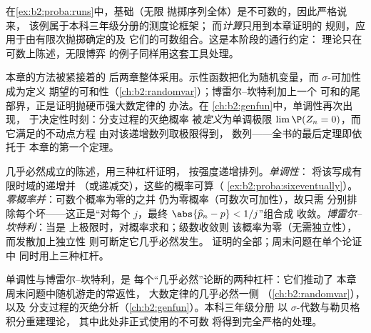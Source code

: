 \begin{remark}
在\cref{ex:b2:proba:runs}中，基础（无限
抛掷序列全体）是不可数的，因此严格说来，
该例属于本科三年级分册的测度论框架；
而\emph{计算}只用到本章证明的
规则，应用于由有限次抛掷确定的及
它们的可数组合。这是本阶段的通行约定：
理论只在可数上陈述，无限博弈
的例子同样用这套工具处理。
\end{remark}

\begin{remark}[本分册内的展望]
本章的方法被紧接着的
后两章整体采用。示性函数把化为随机变量，而
$\sigma$-可加性成为定义
期望的可和性（\cref{ch:b2:randomvar}）；博雷尔--坎特利加上一个
可和的尾部界，正是证明抛硬币强大数定律的
办法。在
\cref{ch:b2:genfun}中，单调性再次出现，
于决定性时刻：分支过程的灭绝概率
被\emph{定义}为单调极限
$\lim\P(Z_n = 0)$，而它满足的不动点方程
由对该递增数列取极限得到，
数列——全书的最后定理即依托于
本章的第一个定理。
\end{remark}

\begin{remark}[方法：证明概率为一的三种途径]
几乎必然成立的陈述，用三种杠杆证明，
按强度递增排列。\emph{单调性}：
将该写成有限时域的递增并
（或递减交），这些的概率可算（
\cref{ex:b2:proba:sixeventually}）。
\emph{零概率并}：可数个概率为零的之并
仍为零概率（可数次可加性），故只需
分别排除每个坏——这正是“对每个
$j$，最终 $\abs{\widehat p_n - p} < 1/j$”组合成
收敛。\emph{博雷尔--坎特利}：当是
上极限时，对概率求和；级数收敛则
该概率为零（无需独立性），而发散加上独立性
则可断定它几乎必然发生。
证明的全部；周末问题在单个论证中
同时用上三种杠杆。
\end{remark}

\begin{remark}[应用之处]
单调性与博雷尔--坎特利，是
每个“几乎必然”论断的两种杠杆：它们推动了
本章周末问题中随机游走的常返性，
大数定律的几乎必然一侧
（\cref{ch:b2:randomvar}），以及
分支过程的灭绝分析（\cref{ch:b2:genfun}）。本科三年级分册
以 $\sigma$-代数与勒贝格积分重建理论，
其中此处非正式使用的不可数
将得到完全严格的处理。
\end{remark}

